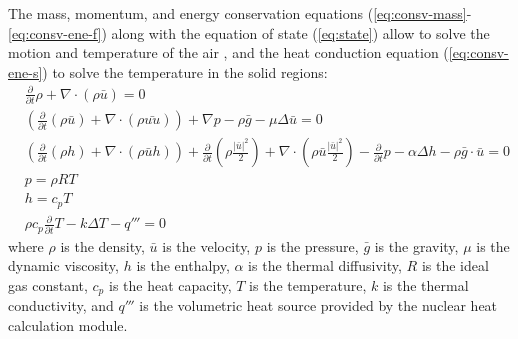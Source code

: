 The mass, momentum, and energy conservation equations (\ref{eq:consv-mass}-\ref{eq:consv-ene-f}) along with the equation of state (\ref{eq:state}) allow to solve the motion and temperature of the air \cite{openfoam}, and the heat conduction equation (\ref{eq:consv-ene-s}) to solve the temperature in the solid regions:
\begin{align}
& \frac{\partial}{\partial t} \rho + \nabla \cdot (\rho \bar{u}) = 0  \label{eq:consv-mass} \\
& \left( \frac{\partial}{\partial t} (\rho \bar{u}) + \nabla \cdot \left( \rho \bar{u u} \right) \right) + \nabla p - \rho \bar{g} - \mu \Delta \bar{u} = 0 \label{eq:consv-mom} \\
& \left( \frac{\partial}{\partial t} (\rho h) + \nabla \cdot \left( \rho \bar{u} h \right) \right) + \frac{\partial}{\partial t} \left( \rho \frac{|\bar{u}|^2}{2} \right) + \nabla \cdot \left( \rho \bar{u} \frac{|\bar{u}|^2}{2} \right) - \frac{\partial}{\partial t}p - \alpha \Delta h - \rho \bar{g} \cdot \bar{u} = 0 \label{eq:consv-ene-f} \\
& p = \rho R T \label{eq:state} \\
& h = c_p T \\
& \rho c_p \frac{\partial}{\partial t} T - k \Delta T - q''' = 0 \label{eq:consv-ene-s}
\end{align}
where $\rho$ is the density, $\bar{u}$ is the velocity, $p$ is the pressure, $\bar{g}$ is the gravity, $\mu$ is the dynamic viscosity, $h$ is the enthalpy, $\alpha$ is the thermal diffusivity, $R$ is the ideal gas constant, $c_p$ is the heat capacity, $T$ is the temperature, $k$ is the thermal conductivity, and $q'''$ is the volumetric heat source provided by the nuclear heat calculation module.




